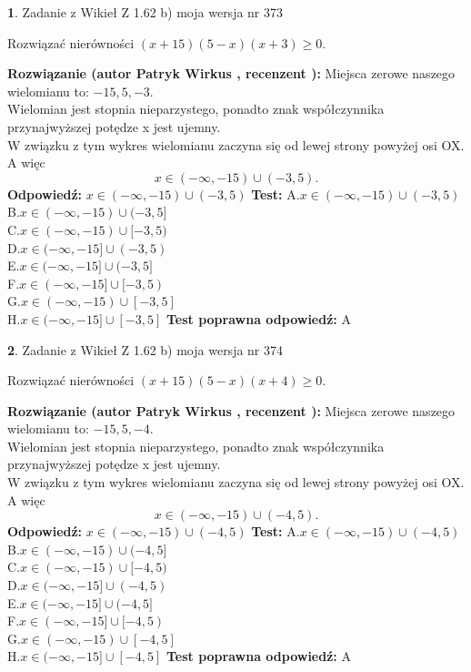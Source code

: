\documentclass[12pt, a4paper]{article}
\theoremstyle{definition} %
\newtheorem{zad}{}
\newcommand{\zadStart}[1]{\begin{zad}#1\newline}
\newcommand{\zadStop}{\end{zad}}
\newcommand{\rozwStart}[2]{\noindent \textbf{Rozwiązanie (autor #1 , recenzent #2): }\newline}
\newcommand{\rozwStop}{\newline}
\newcommand{\odpStart}{\noindent \textbf{Odpowiedź:}\newline}
\newcommand{\odpStop}{\newline}
\newcommand{\testStart}{\noindent \textbf{Test:}\newline}
\newcommand{\testStop}{\newline}
\newcommand{\kluczStart}{\noindent \textbf{Test poprawna odpowiedź:}\newline}
\newcommand{\kluczStop}{\newline}
\begin{document}
\zadStart{Zadanie z Wikieł Z 1.62 b) moja wersja nr 373}

Rozwiązać nierówności $(x+15)(5-x)(x+3)\ge0$.
\zadStop
\rozwStart{Patryk Wirkus}{}
Miejsca zerowe naszego wielomianu to: $-15, 5, -3$.\\
Wielomian jest stopnia nieparzystego, ponadto znak współczynnika przy\linebreak najwyższej potędze x jest ujemny.\\ W związku z tym wykres wielomianu zaczyna się od lewej strony powyżej osi OX. A więc $$x \in (-\infty,-15) \cup (-3,5).$$
\rozwStop
\odpStart
$x \in (-\infty,-15) \cup (-3,5)$
\odpStop
\testStart
A.$x \in (-\infty,-15) \cup (-3,5)$\\
B.$x \in (-\infty,-15) \cup (-3,5]$\\
C.$x \in (-\infty,-15) \cup [-3,5)$\\
D.$x \in (-\infty,-15] \cup (-3,5)$\\
E.$x \in (-\infty,-15] \cup (-3,5]$\\
F.$x \in (-\infty,-15] \cup [-3,5)$\\
G.$x \in (-\infty,-15) \cup [-3,5]$\\
H.$x \in (-\infty,-15] \cup [-3,5]$
\testStop
\kluczStart
A
\kluczStop



\zadStart{Zadanie z Wikieł Z 1.62 b) moja wersja nr 374}

Rozwiązać nierówności $(x+15)(5-x)(x+4)\ge0$.
\zadStop
\rozwStart{Patryk Wirkus}{}
Miejsca zerowe naszego wielomianu to: $-15, 5, -4$.\\
Wielomian jest stopnia nieparzystego, ponadto znak współczynnika przy\linebreak najwyższej potędze x jest ujemny.\\ W związku z tym wykres wielomianu zaczyna się od lewej strony powyżej osi OX. A więc $$x \in (-\infty,-15) \cup (-4,5).$$
\rozwStop
\odpStart
$x \in (-\infty,-15) \cup (-4,5)$
\odpStop
\testStart
A.$x \in (-\infty,-15) \cup (-4,5)$\\
B.$x \in (-\infty,-15) \cup (-4,5]$\\
C.$x \in (-\infty,-15) \cup [-4,5)$\\
D.$x \in (-\infty,-15] \cup (-4,5)$\\
E.$x \in (-\infty,-15] \cup (-4,5]$\\
F.$x \in (-\infty,-15] \cup [-4,5)$\\
G.$x \in (-\infty,-15) \cup [-4,5]$\\
H.$x \in (-\infty,-15] \cup [-4,5]$
\testStop
\kluczStart
A
\kluczStop
\end{document}
